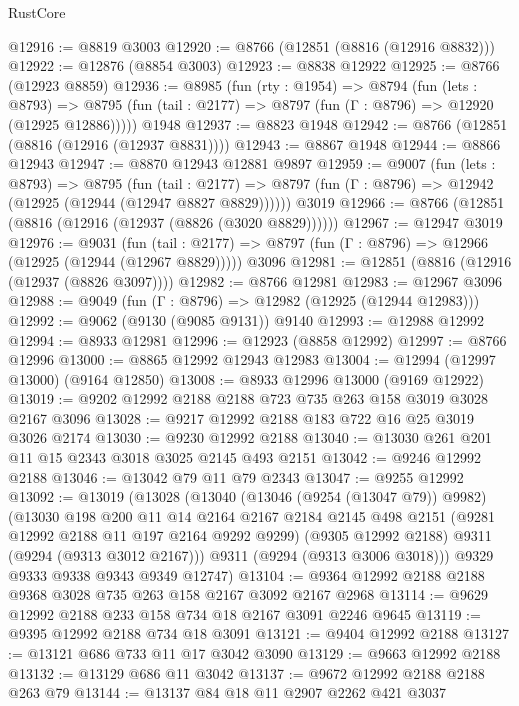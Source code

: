 \begin{lexlean}{RustCore}
\begin{coremodule}
@12916 := @8819 @3003
@12920 := @8766 (@12851 (@8816 (@12916 @8832)))
@12922 := @12876 (@8854 @3003)
@12923 := @8838 @12922
@12925 := @8766 (@12923 @8859)
@12936 := @8985
    (fun (rty : @1954) =>
    @8794
      (fun (lets : @8793) =>
      @8795 (fun (tail : @2177) => @8797 (fun (Γ : @8796) => @12920 (@12925 @12886)))))
    @1948
@12937 := @8823 @1948
@12942 := @8766 (@12851 (@8816 (@12916 (@12937 @8831))))
@12943 := @8867 @1948
@12944 := @8866 @12943
@12947 := @8870 @12943 @12881 @9897
@12959 := @9007
    (fun (lets : @8793) =>
    @8795
      (fun (tail : @2177) =>
      @8797 (fun (Γ : @8796) => @12942 (@12925 (@12944 (@12947 @8827 @8829))))))
    @3019
@12966 := @8766 (@12851 (@8816 (@12916 (@12937 (@8826 (@3020 @8829))))))
@12967 := @12947 @3019
@12976 := @9031
    (fun (tail : @2177) => @8797 (fun (Γ : @8796) => @12966 (@12925 (@12944 (@12967 @8829)))))
    @3096
@12981 := @12851 (@8816 (@12916 (@12937 (@8826 @3097))))
@12982 := @8766 @12981
@12983 := @12967 @3096
@12988 := @9049 (fun (Γ : @8796) => @12982 (@12925 (@12944 @12983)))
@12992 := @9062 (@9130 (@9085 @9131)) @9140
@12993 := @12988 @12992
@12994 := @8933 @12981
@12996 := @12923 (@8858 @12992)
@12997 := @8766 @12996
@13000 := @8865 @12992 @12943 @12983
@13004 := @12994 (@12997 @13000) (@9164 @12850)
@13008 := @8933 @12996 @13000 (@9169 @12922)
@13019 := @9202 @12992 @2188 @2188 @723 @735 @263 @158 @3019 @3028 @2167 @3096
@13028 := @9217 @12992 @2188 @183 @722 @16 @25 @3019 @3026 @2174
@13030 := @9230 @12992 @2188
@13040 := @13030 @261 @201 @11 @15 @2343 @3018 @3025 @2145 @493 @2151
@13042 := @9246 @12992 @2188
@13046 := @13042 @79 @11 @79 @2343
@13047 := @9255 @12992
@13092 := @13019
    (@13028
      (@13040
        (@13046 (@9254 (@13047 @79)) @9982)
        (@13030
          @198
          @200
          @11
          @14
          @2164
          @2167
          @2184
          @2145
          @498
          @2151
          (@9281 @12992 @2188 @11 @197 @2164 @9292 @9299)
          (@9305 @12992 @2188)
          @9311
          (@9294 (@9313 @3012 @2167)))
        @9311
        (@9294 (@9313 @3006 @3018)))
      @9329
      @9333
      @9338
      @9343
      @9349
      @12747)
@13104 := @9364 @12992 @2188 @2188 @9368 @3028 @735 @263 @158 @2167 @3092 @2167 @2968
@13114 := @9629 @12992 @2188 @233 @158 @734 @18 @2167 @3091 @2246 @9645
@13119 := @9395 @12992 @2188 @734 @18 @3091
@13121 := @9404 @12992 @2188
@13127 := @13121 @686 @733 @11 @17 @3042 @3090
@13129 := @9663 @12992 @2188
@13132 := @13129 @686 @11 @3042
@13137 := @9672 @12992 @2188 @2188 @263 @79
@13144 := @13137 @84 @18 @11 @2907 @2262 @421 @3037

\end{coremodule}
\end{lexlean}
